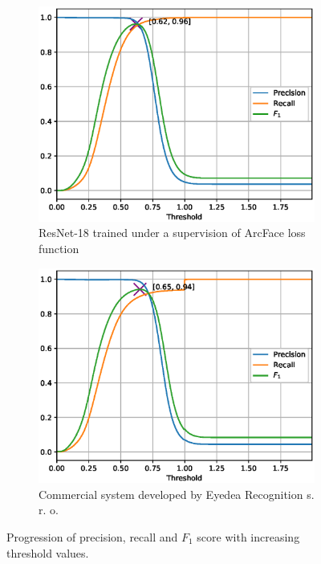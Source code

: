 \begin{figure}[H]
    \begin{subfigure}{\textwidth}
        \centering
        \includegraphics[width=0.95\columnwidth]{images/implementation/prft_fav-128_N1.eps}
        \caption{ResNet-18 trained under a supervision of ArcFace loss function}
        \label{fig:prft_arcface}
    \end{subfigure}%

    \begin{subfigure}{\textwidth}
        \centering
        \includegraphics[width=0.95\columnwidth]{images/implementation/prft_eyedea.eps}
        \caption{Commercial system developed by Eyedea Recognition s. r. o.}
        \label{fig:prft_eyedea}
    \end{subfigure}
    \caption{Progression of precision, recall and $F_1$ score with increasing threshold values.}
    \label{fig:prft}
\end{figure}

